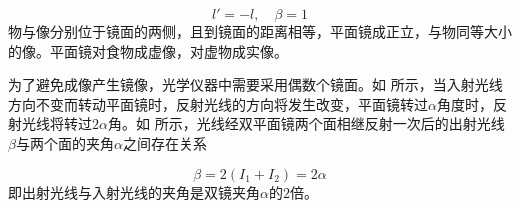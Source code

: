 \documentclass[cn,10pt,chinesefont=founder,math=mtpro2,cite=super,toc=onecol,twoside,openany]{elegantbook}
\begin{document}
\begin{equation}
l'=-l,\quad\beta=1
\end{equation}
物与像分别位于镜面的两侧，且到镜面的距离相等，平面镜成正立，与物同等大小的像。平面镜对食物成虚像，对虚物成实像。

为了避免成像产生镜像，光学仪器中需要采用偶数个镜面。如 所示，当入射光线方向不变而转动平面镜时，反射光线的方向将发生改变，平面镜转过$\alpha$角度时，反射光线将转过$2\alpha$角。如 所示，光线经双平面镜两个面相继反射一次后的出射光线$\beta$与两个面的夹角$\alpha$之间存在关系

\begin{equation}
\beta=2(I_1+I_2)=2\alpha
\end{equation}
即出射光线与入射光线的夹角是双镜夹角$\alpha$的$2$倍。
\end{document}
